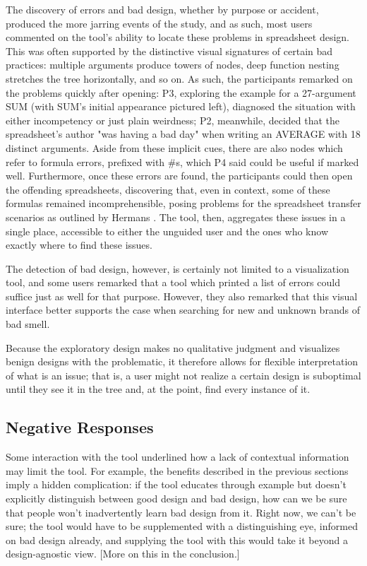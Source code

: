 \documentclass[conference]{IEEEtran}
\begin{document}
	The discovery of errors and bad design, whether by purpose or accident,
	produced the more jarring events of the study, and as such, most users
	commented on the tool's ability to locate these problems in spreadsheet design.
	This was often supported by the distinctive visual signatures of certain bad
	practices: multiple arguments produce towers of nodes, deep function nesting
	stretches the tree horizontally, and so on. As such, the participants remarked
	on the problems quickly after opening: P3, exploring the example for a
	27-argument SUM (with SUM's initial appearance pictured left), diagnosed the
	situation with either incompetency or just plain weirdness; P2, meanwhile,
	decided that the spreadsheet's author "was having a bad day" when writing an
	AVERAGE with 18 distinct arguments. Aside from these implicit cues, there are
	also nodes which refer to formula errors, prefixed with \#s, which P4 said
	could be useful if marked well. Furthermore, once these errors are found, the
	participants could then open the offending spreadsheets, discovering that, even
	in context, some of these formulas remained incomprehensible, posing problems
	for the spreadsheet transfer scenarios as outlined by Hermans \cite{hermans2011supporting}.
	The tool, then, aggregates
	these issues in a single place, accessible to either the unguided user and the
	ones who know exactly where to find these issues. \par
	
	The detection of bad design, however, is certainly not limited to a
	visualization tool, and some users remarked that a tool which printed a list of
	errors could suffice just as well for that purpose. However, they also remarked
	that this visual interface better supports the case when searching for new and
	unknown brands of bad smell.
	
	Because the exploratory design makes no qualitative judgment and visualizes
	benign designs with the problematic, it therefore allows for flexible
	interpretation of what is an issue; that is, a user might not realize a certain
	design is suboptimal until they see it in the tree and, at the point, find
	every instance of it.
	
	\subsection{Negative Responses} Some interaction with the tool underlined how a
	lack of contextual information may limit the tool. For example, the benefits
	described in the previous sections imply a hidden complication: if the tool
	educates through example but doesn't explicitly distinguish between good design
	and bad design, how can we be sure that people won't inadvertently learn bad
	design from it. Right now, we can't be sure; the tool would have to be
	supplemented with a distinguishing eye, informed on bad design already, and
	supplying the tool with this would take it beyond a design-agnostic view. [More
	on this in the conclusion.] \par
	
\end{document}
